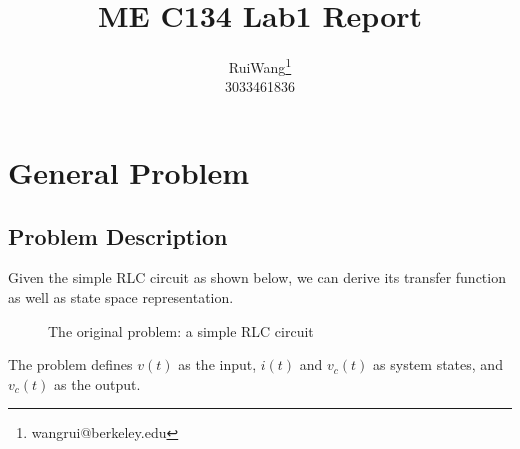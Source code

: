 \documentclass{article}
\title{ME C134 Lab1 Report}
\author{\large Rui\hspace{0.5cm}Wang\footnote{wangrui@berkeley.edu} \\ 3033461836}
\date{}
\begin{document}
\maketitle
\tableofcontents
\clearpage

\section{General Problem}

  \subsection{Problem Description}
  Given the simple RLC circuit as shown below, we can derive its transfer function as well as state space representation.
        \begin{figure}[H]
        \centering
        \noindent{}
        \caption{The original problem: a simple RLC circuit} \label{fig:circuit}
      \end{figure}
  The problem defines $v(t)$ as the input, $i(t)$ and $v_c(t)$ as system states, and $v_c(t)$ as the output.
  
\end{document}
